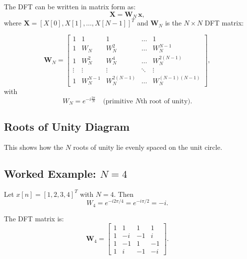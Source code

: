 \documentclass[a4paper,12pt]{article}
\begin{document}
The DFT can be written in matrix form as:
\[
\mathbf{X} = \mathbf{W}_N \, \mathbf{x},
\]
where $\mathbf{X} = [X[0], X[1], \dots, X[N-1]]^T$ and $\mathbf{W}_N$ is the $N \times N$ DFT matrix:

\[
\mathbf{W}_N = 
\begin{bmatrix}
1 & 1 & 1 & \dots & 1 \\
1 & W_N & W_N^2 & \dots & W_N^{N-1} \\
1 & W_N^2 & W_N^4 & \dots & W_N^{2(N-1)} \\
\vdots & \vdots & \vdots & \ddots & \vdots \\
1 & W_N^{N-1} & W_N^{2(N-1)} & \dots & W_N^{(N-1)(N-1)}
\end{bmatrix},
\]
with
\[
W_N = e^{-i \frac{2\pi}{N}} \quad \text{(primitive $N$th root of unity)}.
\]

\subsection{Roots of Unity Diagram}

\begin{center}
\end{center}

This shows how the $N$ roots of unity lie evenly spaced on the unit circle.


\subsection{Worked Example: $N=4$}

Let $x[n] = [1,2,3,4]^T$ with $N=4$. Then
\[
W_4 = e^{-i2\pi/4} = e^{-i\pi/2} = -i.
\]

The DFT matrix is:
\[
\mathbf{W}_4 =
\begin{bmatrix}
1 & 1 & 1 & 1 \\
1 & -i & -1 & i \\
1 & -1 & 1 & -1 \\
1 & i & -1 & -i
\end{bmatrix}.
\]
\end{document}
